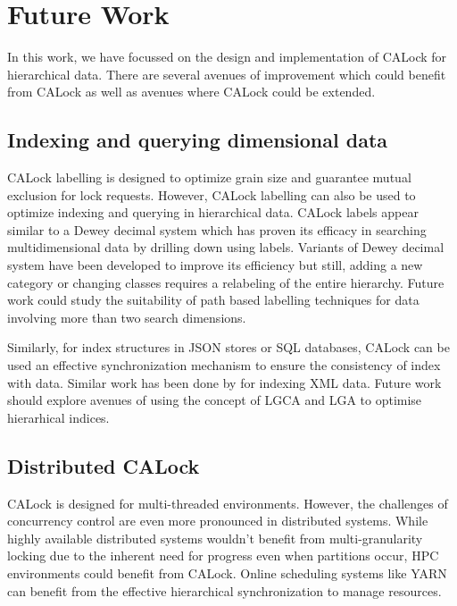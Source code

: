 \section{Future Work}

In this work, we have focussed on the design and implementation of CALock for hierarchical data. There are several avenues of improvement which could benefit from CALock as well as avenues where CALock could be extended.

\subsection{Indexing and querying dimensional data}
CALock labelling is designed to optimize grain size and guarantee mutual exclusion for lock requests. However, CALock labelling can also be used to optimize indexing and querying in hierarchical data. CALock labels appear similar to a Dewey decimal system \cite{DBLP:journals/jd/Sweeney83} which has proven its efficacy in searching multidimensional data by drilling down using labels. Variants of Dewey decimal system have been developed to improve its efficiency but still, adding a new category or changing classes requires a relabeling of the entire hierarchy. Future work could study the suitability of path based labelling techniques for data involving more than two search dimensions. 

Similarly, for index structures in JSON stores or SQL databases, CALock can be used an effective synchronization mechanism to ensure the consistency of index with data. Similar work has been done by \citet{DBLP:journals/pvldb/FinisBK0MF15} for indexing XML data. Future work should explore avenues of using the concept of LGCA and LGA to optimise hierarhical indices. 

\subsection{Distributed CALock}

CALock is designed for multi-threaded environments. However, the challenges of concurrency control are even more pronounced in distributed systems. While highly available distributed systems wouldn't benefit from multi-granularity locking due to the inherent need for progress even when partitions occur, HPC environments could benefit from CALock. Online scheduling systems like YARN \cite{DBLP:conf/cloud/VavilapalliMDAKEGLSSSCORRB13} can benefit from the effective hierarchical synchronization to manage resources.


